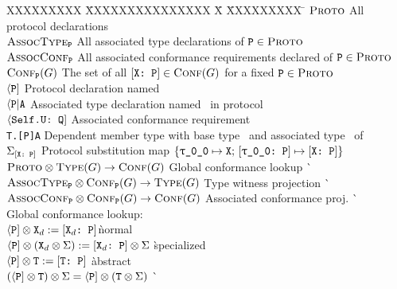 \documentclass[../generics]{subfiles}
\begin{document}
\begin{tabbing}
XXXXXXXXX \= XXXXXXXXXXXXXXX \= X \= XXXXXXXXX \= \kill
{}$\textsc{Proto}$ \> All protocol declarations\\
$\textsc{AssocType}_{\texttt{P}}$ \> All associated type declarations of $\texttt{P}\in\textsc{Proto}$\\
$\textsc{AssocConf}_{\texttt{P}}$ \> All associated conformance requirements declared of $\texttt{P}\in\textsc{Proto}$\\
$\textsc{Conf}_{\texttt{P}}({G})$ \> The set of all $[\texttt{X:~P}]\in\textsc{Conf}({G})$ for a fixed $\texttt{P}\in\textsc{Proto}$\\[\medskipamount]
$\langle\texttt{P}]$ \> Protocol declaration named \tP\\
$\langle\texttt{P}|\texttt{A}$ \> Associated type declaration named \nA\ in protocol \tP\\
$\langle\texttt{Self.U:~Q}]$ \> Associated conformance requirement\\
\texttt{T.[P]A} \> Dependent member type with base type \tT\ and associated type \nA\ of \tP\\
$\Sigma_{[\texttt{X:~P}]}$ \> Protocol substitution map $\SubstMapC{\SubstType{\rT}{X}}{\SubstConf{\rT}{X}{P}}$\\[\bigskipamount]
$\textsc{Proto}\otimes\textsc{Type}({G})\rightarrow\textsc{Conf}({G})$ \> \> Global conformance lookup \` \\
$\textsc{AssocType}_{\texttt{P}}\otimes\textsc{Conf}_{\texttt{P}}({G})\rightarrow\textsc{Type}({G})$ \> \> Type witness projection \` \\
$\textsc{AssocConf}_{\texttt{P}}\otimes\textsc{Conf}_{\texttt{P}}({G})\rightarrow\textsc{Conf}({G})$ \> \> Associated conformance proj. \` \\[\bigskipamount]
Global conformance lookup:\\
\qquad $\langle\texttt{P}] \otimes \texttt{X}_d := [\texttt{$\texttt{X}_d$:~P}]$\` normal\\
\qquad $\langle\texttt{P}] \otimes (\texttt{X}_d \otimes \Sigma) := [\texttt{$\texttt{X}_d$:~P}] \otimes \Sigma$ \` specialized\\
\qquad $\langle\texttt{P}] \otimes \texttt{T} := [\texttt{T:~P}]$ \` abstract\\
\qquad $(\langle\texttt{P}] \otimes \texttt{T}) \otimes \Sigma = \langle\texttt{P}] \otimes (\texttt{T} \otimes \Sigma)$ \` \\[\medskipamount]

\end{tabbing}
\end{document}
